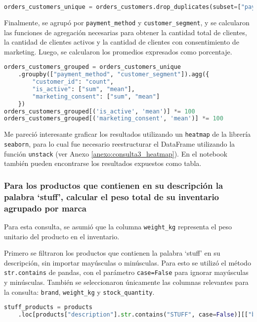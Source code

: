\begin{lstlisting}[language=Python, xleftmargin=23pt, xrightmargin=23pt]
orders_customers_unique = orders_customers.drop_duplicates(subset=["payment_method", "customer_id"])
\end{lstlisting}

Finalmente, se agrupó por \texttt{payment\_method} y \texttt{customer\_segment}, y se calcularon las funciones de agregación necesarias para obtener la cantidad total de clientes, la cantidad de clientes activos y la cantidad de clientes con consentimiento de marketing. Luego, se calcularon los promedios expresados como porcentaje.

\begin{lstlisting}[language=Python, xleftmargin=100pt, xrightmargin=100pt]
orders_customers_grouped = orders_customers_unique
    .groupby(["payment_method", "customer_segment"]).agg({
        "customer_id": "count",
        "is_active": ["sum", "mean"],
        "marketing_consent": ["sum", "mean"]
    })
orders_customers_grouped[('is_active', 'mean')] *= 100
orders_customers_grouped[('marketing_consent', 'mean')] *= 100
\end{lstlisting}

Me pareció interesante graficar los resultados utilizando un \texttt{heatmap} de la librería \texttt{seaborn}, para lo cual fue necesario reestructurar el DataFrame utilizando la función \texttt{unstack} (ver Anexo \ref{anexo:consulta3_heatmap}). En el notebook también pueden encontrarse los resultados expuestos como tabla.

\subsubsection{Para los productos que contienen en su descripción la palabra `stuff', calcular el peso total de su inventario agrupado por marca}

Para esta consulta, se asumió que la columna \texttt{weight\_kg} representa el peso unitario del producto en el inventario.

Primero se filtraron los productos que contienen la palabra `stuff' en su descripción, sin importar mayúsculas o minúsculas. Para esto se utilizó el método \texttt{str.contains} de pandas, con el parámetro \texttt{case=False} para ignorar mayúsculas y minúsculas. También se seleccionaron únicamente las columnas relevantes para la consulta: \texttt{brand}, \texttt{weight\_kg} y \texttt{stock\_quantity}.

\begin{lstlisting}[language=Python, xleftmargin=0pt, xrightmargin=0pt]
stuff_products = products
    .loc[products["description"].str.contains("STUFF", case=False)][["brand", "weight_kg", "stock_quantity"]]
\end{lstlisting}

